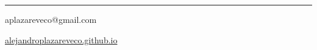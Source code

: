 \documentclass[aspectratio=169,11pt]{beamer}
\begin{document}
\begin{frame}[plain]
  \vspace{0.5cm}
  {\color{marino}\inserttitle\par}
  \vspace{0.2cm}
  {\color{gris}\insertsubtitle\par}
  \vspace{0.3cm}
  {\color{dorado}\rule{0.6\textwidth}{1pt}\par}
  \vspace{0.6cm}
  {\insertauthor\par}\vspace{0.1cm}
  {\small aplazareveco@gmail.com\par}\vspace{0.1cm}
  {\small\href{https://alejandroplazareveco.github.io/}{\textcolor{doradooscuro}{alejandroplazareveco.github.io}}\par}
\end{frame}
\end{document}

